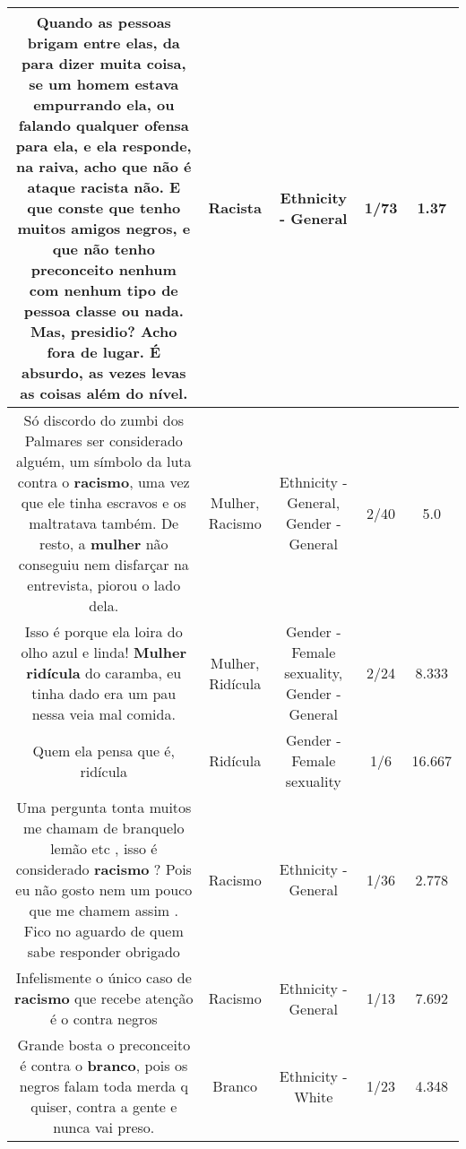 \documentclass[11pt]{article}
\newlength\mylength
\begin{document}
\begin{center}
\begin{longtable}{|C{.65\mylength}|C{.30\mylength}|C{.12\mylength}|C{.12\mylength}|C{.12\mylength}|}
  \small Quando as pessoas brigam entre elas, da para dizer muita coisa, se um homem estava empurrando ela, ou falando qualquer ofensa para ela, e ela responde, na raiva, acho que não é ataque \textbf{racista} não. E que conste que tenho muitos amigos negros, e que não tenho preconceito nenhum com nenhum tipo de pessoa classe ou nada. Mas, presidio? Acho fora de lugar. É absurdo, as vezes levas as coisas além do nível.\normalsize   & Racista & Ethnicity - General & 1/73 & 1.37 \\  \hline
  \small Só discordo do zumbi dos Palmares ser considerado alguém, um símbolo da luta contra o \textbf{racismo}, uma vez que ele tinha escravos e os maltratava também. De resto, a \textbf{mulher} não conseguiu nem disfarçar na entrevista,  piorou o lado dela.\normalsize   & Mulher, Racismo & Ethnicity - General, Gender - General & 2/40 & 5.0 \\  \hline
  \small Isso é porque ela loira do olho azul e linda! \textbf{Mulher} \textbf{ridícula} do caramba, eu tinha dado era um pau nessa veia mal comida.\normalsize   & Mulher, Ridícula & Gender - Female sexuality, Gender - General & 2/24 & 8.333 \\  \hline
  \small Quem ela pensa que é, ridícula\normalsize   & Ridícula & Gender - Female sexuality & 1/6 & 16.667 \\  \hline
  \small Uma pergunta tonta muitos me chamam de branquelo lemão  etc , isso é considerado \textbf{racismo} ? Pois eu não gosto nem um pouco que me chamem assim . Fico no aguardo de quem sabe responder obrigado\normalsize   & Racismo & Ethnicity - General & 1/36 & 2.778 \\  \hline
  \small Infelismente o único caso de \textbf{racismo} que recebe atenção é o contra negros\normalsize   & Racismo & Ethnicity - General & 1/13 & 7.692 \\  \hline
  \small Grande bosta o preconceito é contra o \textbf{branco}, pois os negros falam toda merda q quiser, contra a gente e nunca vai preso.\normalsize   & Branco & Ethnicity - White & 1/23 & 4.348 \\  \hline

\end{longtable}
\end{center}
\end{document}
